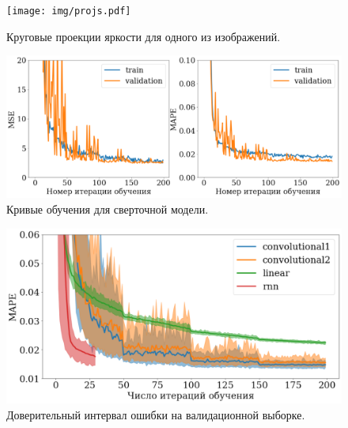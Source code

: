 \documentclass[12pt, twoside]{article}
\begin{document}
\begin{figure}[b]
	\centering
	\texttt{[image: img/projs.pdf]}
	\caption{Круговые проекции яркости для одного из изображений.}
	\label{fig:projs}
\end{figure}

\begin{figure}[b]
	\centering
	\includegraphics[scale=0.4]{img/single_experiment.pdf}
	\caption{Кривые обучения для сверточной модели.}
	\label{fig:singleexp}
\end{figure}

\begin{figure}[b]
	\centering
	\includegraphics[scale=0.4]{img/multerror.pdf}
	\caption{Доверительный интервал ошибки на валидационной выборке.}
	\label{fig:multerr}
\end{figure}
\end{document}
